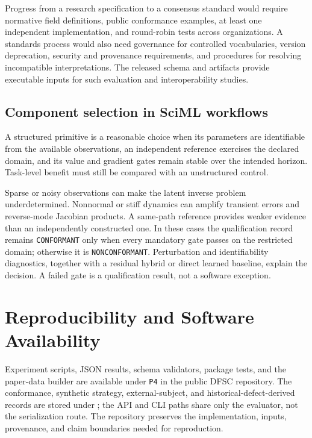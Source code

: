 \documentclass[preprint,12pt,authoryear]{elsarticle}
\begin{document}
Progress from a research specification to a consensus standard would require normative field definitions, public conformance examples, at least one independent implementation, and round-robin tests across organizations. A standards process would also need governance for controlled vocabularies, version deprecation, security and provenance requirements, and procedures for resolving incompatible interpretations. The released schema and artifacts provide executable inputs for such evaluation and interoperability studies.

\subsection{Component selection in SciML workflows}
A structured primitive is a reasonable choice when its parameters are identifiable from the available observations, an independent reference exercises the declared domain, and its value and gradient gates remain stable over the intended horizon. Task-level benefit must still be compared with an unstructured control.

Sparse or noisy observations can make the latent inverse problem underdetermined. Nonnormal or stiff dynamics can amplify transient errors and reverse-mode Jacobian products. A same-path reference provides weaker evidence than an independently constructed one. In these cases the qualification record remains \texttt{CONFORMANT} only when every mandatory gate passes on the restricted domain; otherwise it is \texttt{NONCONFORMANT}. Perturbation and identifiability diagnostics, together with a residual hybrid or direct learned baseline, explain the decision. A failed gate is a qualification result, not a software exception.

\section{Reproducibility and Software Availability}
Experiment scripts, JSON results, schema validators, package tests, and the paper-data builder are available under \texttt{P4} in the public DFSC repository. The conformance, synthetic strategy, external-subject, and historical-defect-derived records are stored under ; the API and CLI paths share only the evaluator, not the serialization route. The repository preserves the implementation, inputs, provenance, and claim boundaries needed for reproduction.
\end{document}

